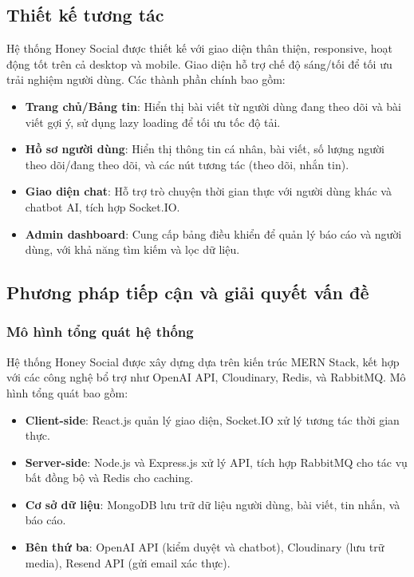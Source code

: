\subsection{Thiết kế tương tác}
Hệ thống Honey Social được thiết kế với giao diện thân thiện, responsive, hoạt động tốt trên cả desktop và mobile. Giao diện hỗ trợ chế độ sáng/tối để tối ưu trải nghiệm người dùng. Các thành phần chính bao gồm:
\begin{itemize}
    \item \textbf{Trang chủ/Bảng tin}: Hiển thị bài viết từ người dùng đang theo dõi và bài viết gợi ý, sử dụng lazy loading để tối ưu tốc độ tải.
    \item \textbf{Hồ sơ người dùng}: Hiển thị thông tin cá nhân, bài viết, số lượng người theo dõi/đang theo dõi, và các nút tương tác (theo dõi, nhắn tin).
    \item \textbf{Giao diện chat}: Hỗ trợ trò chuyện thời gian thực với người dùng khác và chatbot AI, tích hợp Socket.IO.
    \item \textbf{Admin dashboard}: Cung cấp bảng điều khiển để quản lý báo cáo và người dùng, với khả năng tìm kiếm và lọc dữ liệu.
\end{itemize}

\subsection{Phương pháp tiếp cận và giải quyết vấn đề}
\subsubsection{Mô hình tổng quát hệ thống}
Hệ thống Honey Social được xây dựng dựa trên kiến trúc MERN Stack, kết hợp với các công nghệ bổ trợ như OpenAI API, Cloudinary, Redis, và RabbitMQ. Mô hình tổng quát bao gồm:
\begin{itemize}
    \item \textbf{Client-side}: React.js quản lý giao diện, Socket.IO xử lý tương tác thời gian thực.
    \item \textbf{Server-side}: Node.js và Express.js xử lý API, tích hợp RabbitMQ cho tác vụ bất đồng bộ và Redis cho caching.
    \item \textbf{Cơ sở dữ liệu}: MongoDB lưu trữ dữ liệu người dùng, bài viết, tin nhắn, và báo cáo.
    \item \textbf{Bên thứ ba}: OpenAI API (kiểm duyệt và chatbot), Cloudinary (lưu trữ media), Resend API (gửi email xác thực).
\end{itemize}

